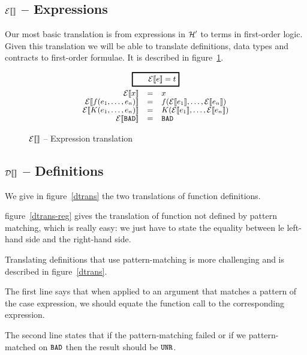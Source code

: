 \documentclass[preprint]{sigplanconf}
\begin{document}
\subsection{$\etrans{}$ -- Expressions}
Our most basic translation is from expressions in $\hprime$ to terms
in first-order logic. Given this translation we will be able to
translate definitions, data types and contracts to first-order
formulae. It is described in figure~\ref{etrans}.

\begin{figure}
$$
\begin{array}{rcl}
\multicolumn{3}{c}{\ruleform{\etrans{e} = t}} \\[2.5mm]
  \etrans{x} &=& x\\
  \etrans{f(e_1,\dots,e_n)} &=& f(\etrans{e_1},\dots,\etrans{e_n})\\
  \etrans{K(e_1,\dots,e_n)} &=& K(\etrans{e_1},\dots,\etrans{e_n})\\
  \etrans{\bad} &=& \bad
\end{array}
$$
\caption{$\etrans{}$ -- Expression translation}
\label{etrans}
\end{figure}

\subsection{$\dtrans{}$ -- Definitions}
We give in figure~\ref{dtrans} the two translations of function
definitions.

figure~\ref{dtrans-reg} gives the translation of function not defined by
pattern matching, which is really easy: we just have to state the
equality between le left-hand side and the right-hand side.

Translating definitions that use pattern-matching is more challenging
and is described in figure~\ref{dtrans}.  

The first line says that when applied to an argument that matches a
pattern of the case expression, we should equate the function call to
the corresponding expression. 

The second line states that if the pattern-matching failed or if we
pattern-matched on $\bad$ then the result should be $\unr$.
\end{document}
